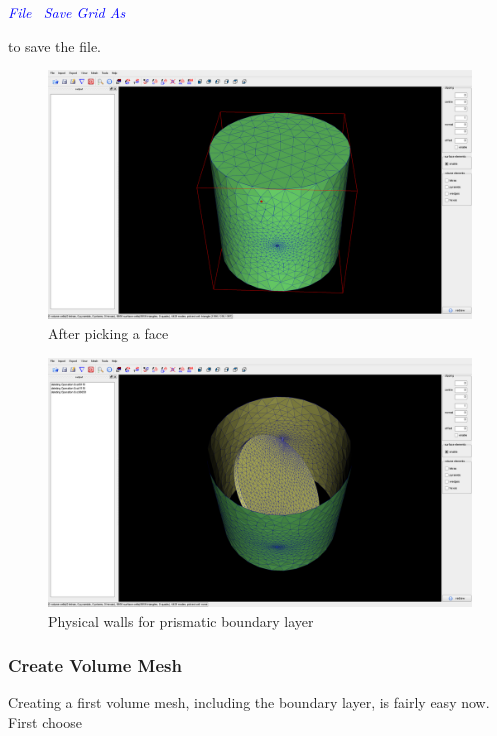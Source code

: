 \documentclass[10pt,a4paper,british]{book}
\newcommand\arr{\guillemotright\ }
\newcommand\menu[1]{\textcolor{blue}{\it \hspace{5mm} #1}}
\begin{document}
\menu{File \arr Save Grid As}

to save the file. 

\begin{figure}
  \begin{centering}
    \includegraphics[width=14cm]{figures/tutorials/T1/scr02}
    \par
  \end{centering}
  \caption{After picking a face}
  \label{fig:T1_scr02}
\end{figure}

\begin{figure}
  \begin{centering}
    \includegraphics[width=14cm]{figures/tutorials/T1/scr03}
    \par
  \end{centering}
  \caption{Physical walls for prismatic boundary layer}
  \label{fig:T1_scr03}
\end{figure}

\clearpage
\subsubsection{Create Volume Mesh}
Creating a first volume mesh, including the boundary layer, is fairly easy now. First choose
\end{document}
